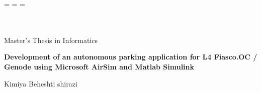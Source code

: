 \begin{titlepage}
  \oddsidemargin=\evensidemargin\relax
  \textwidth=\dimexpr{}\evensidemargin-2in\relax
  \hsize=\textwidth\relax

  \centering


  \vspace{5mm}
  {\huge\MakeUppercase{\getFaculty{}}}\\

  \vspace{5mm}
  {\large\MakeUppercase{\getUniversity{}}}\\

  \vspace{20mm}
  {\large Master's Thesis in Informatics}


  \vspace{15mm}
  \makeatletter
  {\huge\bfseries Development of an autonomous
parking application for L4 Fiasco.OC / Genode
using Microsoft AirSim and
Matlab Simulink}
  \makeatother

  \vspace{15mm}
  {\large Kimiya Beheshti shirazi}

\end{titlepage}